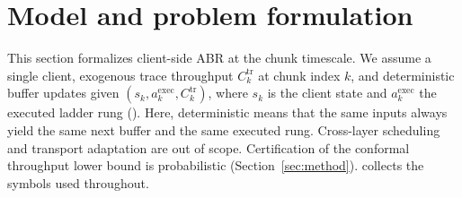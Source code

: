 \section{Model and problem formulation}
\label{sec:system}

This section formalizes client-side ABR at the chunk timescale.
We assume a single client, exogenous trace throughput \(C^{\mathrm{tr}}_k\) at chunk index \(k\), and deterministic buffer updates given \((s_k,a^{\mathrm{exec}}_k,C^{\mathrm{tr}}_k)\), where \(s_k\) is the client state and \(a^{\mathrm{exec}}_k\) the executed ladder rung ().
Here, deterministic means that the same inputs always yield the same next buffer and the same executed rung.
Cross-layer scheduling and transport adaptation are out of scope.
Certification of the conformal throughput lower bound is probabilistic (Section~\ref{sec:method}).
 collects the symbols used throughout.

